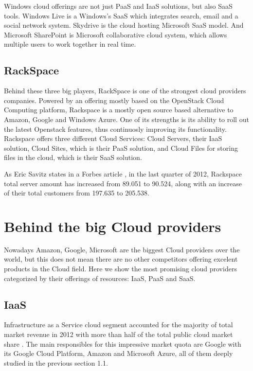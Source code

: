 Windows cloud offerings are not just PaaS and IaaS solutions, but also SaaS tools. Windows Live is a Windows's SaaS which integrates search, email and a social network system. Skydrive is the cloud hosting Microsoft SaaS model. And Microsoft SharePoint is Microsoft collaborative cloud system, which allows multiple users to work together in real time.


\subsection{RackSpace}

Behind these three big players, RackSpace \cite{RackSpace} is one of the strongest cloud providers companies. Powered by an offering mostly based on the OpenStack Cloud Computing platform, Rackspace is a mostly open source based alternative to Amazon, Google and Windows Azure. One of its strengths is its ability to roll out the latest Openstack features, thus continuosly improving its functionality. Rackspace offers three different Cloud Services: Cloud Servers, their IaaS solution, Cloud Sites, which is their PaaS solution, and Cloud Files for storing files in the cloud, which is their SaaS solution. 
\par
As Eric Savitz states in a Forbes article \cite{Rackspace:forbes}, in the last quarter of 2012, Rackspace total server amount has increased from 89.051 to 90.524, along with an increase of their total customers from 197.635 to 205.538.

\section{Behind the big Cloud providers}

Nowadays Amazon, Google, Microsoft are the biggest Cloud providers over the world, but this does not mean there are no other competitors offering excelent products in the Cloud field. Here we show the most promising cloud providers categorized by their offerings of resources: IaaS, PaaS and SaaS.

\subsection{IaaS}

Infrastructure as a Service cloud segment accounted for the majority of total market revenue in 2012 with more than half of the total public cloud market share \cite{aslett2013451}. The main responsibles for this impressive market quota are Google with its Google Cloud Platform, Amazon and Microsoft Azure, all of them deeply studied in the previous section 1.1. 


